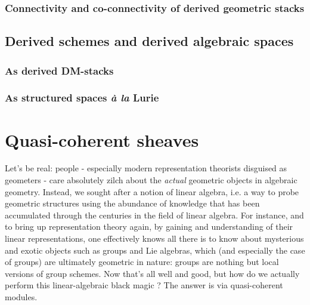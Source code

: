             \subsubsection{Connectivity and co-connectivity of derived geometric stacks}
        
        \subsection{Derived schemes and derived algebraic spaces}
            \subsubsection{As derived DM-stacks}
            
            \subsubsection{As structured spaces \textit{\`a la} Lurie}
        
    \section{Quasi-coherent sheaves} \label{section: qcoh}
        Let's be real: people - especially modern representation theorists disguised as geometers - care absolutely zilch about the \textit{actual} geometric objects in algebraic geometry. Instead, we sought after a notion of  linear algebra, i.e. a way to probe geometric structures using the abundance of knowledge that has been accumulated through the centuries in the field of linear algebra. For instance, and to bring up representation theory again, by gaining and understanding of their linear representations, one effectively knows all there is to know about mysterious and exotic objects such as groups and Lie algebras, which (and especially the case of groups) are ultimately geometric in nature: groups are nothing but local versions of group schemes. Now that's all well and good, but how do we actually perform this linear-algebraic black magic ? The answer is via quasi-coherent modules.
        
